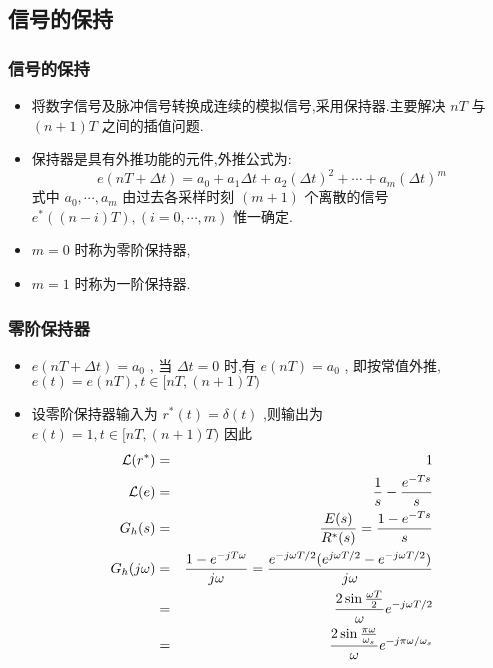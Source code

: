 \documentclass[table]{article}
\begin{document}
\subsection{信号的保持}
\label{sec-2-3}
\begin{frame}
\frametitle{信号的保持}
\label{sec-2-3-1}

\begin{itemize}
\item <2->将数字信号及脉冲信号转换成连续的模拟信号,采用保持器.主要解决  $nT$  与  $(n+1)T$  之间的插值问题.
\item <3->保持器是具有外推功能的元件,外推公式为:  
	  \[e(nT+\Delta t)=a_0+a_1 \Delta t+a_2(\Delta t)^2+\cdots+a_m(\Delta t)^m\]
    式中  $a_0,\cdots,a_m$  由过去各采样时刻  $(m+1)$ 个离散的信号  $e^*((n-i)T),(i=0,\cdots,m)$  惟一确定.
\item <4-> $m=0$ 时称为零阶保持器,
\item <5-> $m=1$ 时称为一阶保持器.
\end{itemize}
\end{frame}
\begin{frame}
\frametitle{零阶保持器}
\label{sec-2-3-2}

\begin{itemize}
\item <2-> $e(nT+\Delta t)=a_0$  , 当  $\Delta t=0$  时,有  $e(nT)=a_0$ , 即按常值外推,  $e(t)=e(nT),t\in [ nT,(n+1)T)$
\item <3-> 设零阶保持器输入为  $r^*(t)=\delta(t)$  ,则输出为  $e(t)=1,t\in [ nT,(n+1)T)$  因此
      \begin{eqnarray*}
      {\cal L} (r^*) &=& 1 \\
      {\cal L} (e) &=& \frac{1}{s}-\frac{e^{-Ts}}{s} \\
      G_h(s) &=& \frac{E(s)}{R^*(s)}
	     = \frac{1-e^{-Ts}}{s} \\
      G_h(j\omega) &= &\frac{1-e^{-jT\omega}}{j\omega} 
       = \frac{e^{-j\omega T/2}(e^{j\omega T/2}-e^{-j\omega T/2})}{j\omega}\\
       &=& \frac{2\sin\frac{\omega T}{2}}{\omega}e^{-j\omega T/2} \\
       &=& \frac{2\sin\frac{\pi\omega}{\omega_s}}{\omega}e^{-j\pi\omega /\omega_s} 
      \end{eqnarray*}
\end{itemize}
\end{frame}
\end{document}

